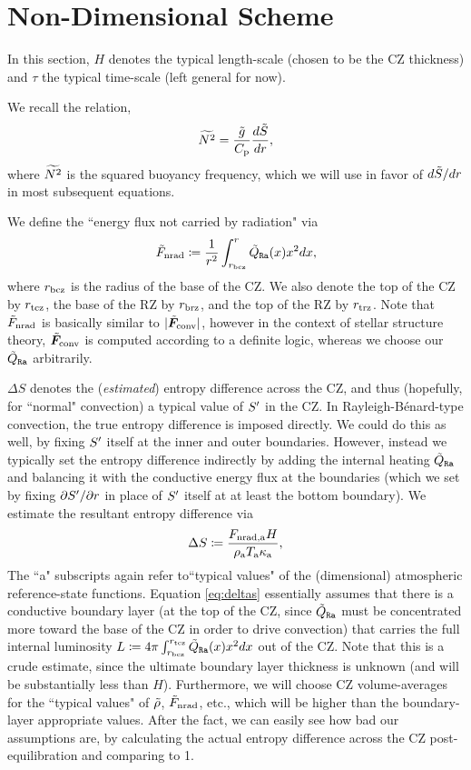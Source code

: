 \documentclass[12pt]{article}
\numberwithin{equation}{section}
\newcommand{\tmpa}{T_{\rm a}}
\newcommand{\rhoa}{\rho_{\rm a}}
\newcommand{\kappaa}{\kappa_{\rm a}}
\newcommand{\fnrada}{F_{\rm{nrad,a}}}
\begin{document}
	\section{Non-Dimensional Scheme}\label{sec:ndscheme}
	In this section, $H$ denotes the typical length-scale (chosen to be the CZ thickness) and $\tau$ the typical time-scale (left general for now). 
	
	We recall the relation,
	\begin{align}\label{eq:nsq}
	\widetilde{N^2} = \frac{\tilde{g}}{C_{\rm{p}}}\frac{d\tilde{S}}{dr},
	\end{align}
	where $\widetilde{N^2}$ is the squared buoyancy frequency, which we will use in favor of $d\tilde{S}/dr$ in most subsequent equations.
	
	We define the ``energy flux not carried by radiation" via
	\begin{align}
		\tilde{F}_{\rm nrad} \coloneqq \frac{1}{r^2}\int_{r_{\rm bcz}}^r\tilde{Q}_{\texttt{Ra}}(x)x^2dx,
	\end{align}
	where $r_{\rm bcz}$ is the radius of the base of the CZ. We also denote the top of the CZ by $r_{\rm tcz}$, the base of the RZ by $r_{\rm brz}$, and the top of the RZ by $r_{\rm trz}$. Note that $\tilde{F}_{\rm nrad}$ is basically similar to $|\tilde{\bm{F}}_{\rm conv}|$, however in the context of stellar structure theory, $\tilde{\bm{F}}_{\rm conv}$ is computed according to a definite logic, whereas we choose our $\tilde{Q}_{\texttt{Ra}}$ arbitrarily.
	
	$\Delta S$ denotes the (\textit{estimated}) entropy difference across the CZ, and thus (hopefully, for ``normal" convection) a typical value of ${S^\prime}$ in the CZ. In Rayleigh-B\'enard-type convection, the true entropy difference is imposed directly. We could do this as well, by fixing ${S^\prime}$ itself at the inner and outer boundaries. However, instead we typically set the entropy difference indirectly by adding the internal heating $\tilde{Q}_{\texttt{Ra}}$ and balancing it with the conductive energy flux at the boundaries (which we set by fixing $\partial{S^\prime}/\partial r$ in place of ${S^\prime}$ itself at at least the bottom boundary). We estimate the resultant entropy difference via
	\begin{align}\label{eq:deltas}
		\Delta S \define \frac{\fnrada H}{\rhoa\tmpa\kappaa},
	\end{align}
	The ``a" subscripts again refer to``typical values" of the (dimensional) atmospheric reference-state functions. Equation \eqref{eq:deltas} essentially assumes that there is a conductive boundary layer (at the top of the CZ, since $\tilde{Q}_{\texttt{Ra}}$ must be concentrated more toward the base of the CZ in order to drive convection) that carries the full internal luminosity $L\coloneqq 4\pi \int_{r_{\rm bcz}}^{r_{\rm tcz}}\tilde{Q}_{\texttt{Ra}}(x)x^2dx$ out of the CZ. Note that this is a crude estimate, since the ultimate boundary layer thickness is unknown (and will be substantially less than $H$). Furthermore, we will choose CZ volume-averages for the ``typical values" of $\tilde{\rho}$, $\tilde{F}_{\rm nrad}$, etc., which will be higher than the boundary-layer appropriate values. After the fact, we can easily see how bad our assumptions are, by calculating the actual entropy difference across the CZ post-equilibration and comparing to 1. 
	
\end{document}
